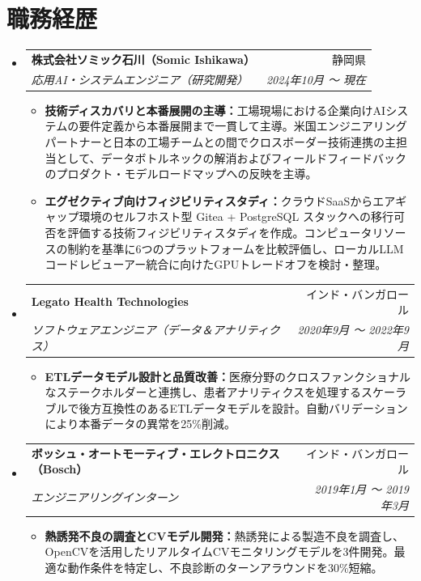 \documentclass[letterpaper,10pt]{article}
\makeatletter
\newcommand{\resumeItem}[1]{
  \item\small{
    {#1 \vspace{-1pt}}
  }
}
\newcommand{\resumeSubheading}[4]{
  \vspace{1.5pt}\item
    \begin{tabular*}{0.97\textwidth}[t]{l@{\extracolsep{\fill}}r}
      \textbf{#1} & #2 \\
      \textit{\small#3} & \textit{\small #4} \\
    \end{tabular*}\vspace{-5pt}
}
\newcommand{\resumeSubHeadingListStart}{\begin{itemize}[leftmargin=0.15in, label={}]}
\newcommand{\resumeSubHeadingListEnd}{\end{itemize}}
\newcommand{\resumeItemListStart}{\begin{itemize}}
\newcommand{\resumeItemListEnd}{\end{itemize}\vspace{-2pt}}
\makeatother
\begin{document}
\section{職務経歴}
  \resumeSubHeadingListStart

    \resumeSubheading
      {株式会社ソミック石川（Somic Ishikawa）}{静岡県}
      {応用AI・システムエンジニア（研究開発）}{2024年10月 〜 現在}
      \resumeItemListStart
        \resumeItem{\textbf{技術ディスカバリと本番展開の主導：}工場現場における企業向けAIシステムの要件定義から本番展開まで一貫して主導。米国エンジニアリングパートナーと日本の工場チームとの間でクロスボーダー技術連携の主担当として、データボトルネックの解消およびフィールドフィードバックのプロダクト・モデルロードマップへの反映を主導。}
        \resumeItem{\textbf{エグゼクティブ向けフィジビリティスタディ：}クラウドSaaSからエアギャップ環境のセルフホスト型 Gitea + PostgreSQL スタックへの移行可否を評価する技術フィジビリティスタディを作成。コンピュータリソースの制約を基準に6つのプラットフォームを比較評価し、ローカルLLMコードレビューアー統合に向けたGPUトレードオフを検討・整理。}
      \resumeItemListEnd

    \resumeSubheading
      {Legato Health Technologies}{インド・バンガロール}
      {ソフトウェアエンジニア（データ＆アナリティクス）}{2020年9月 〜 2022年9月}
      \resumeItemListStart
        \resumeItem{\textbf{ETLデータモデル設計と品質改善：}医療分野のクロスファンクショナルなステークホルダーと連携し、患者アナリティクスを処理するスケーラブルで後方互換性のあるETLデータモデルを設計。自動バリデーションにより本番データの異常を25\%削減。}
      \resumeItemListEnd

    \resumeSubheading
      {ボッシュ・オートモーティブ・エレクトロニクス（Bosch）}{インド・バンガロール}
      {エンジニアリングインターン}{2019年1月 〜 2019年3月}
      \resumeItemListStart
        \resumeItem{\textbf{熱誘発不良の調査とCVモデル開発：}熱誘発による製造不良を調査し、OpenCVを活用したリアルタイムCVモニタリングモデルを3件開発。最適な動作条件を特定し、不良診断のターンアラウンドを30\%短縮。}
      \resumeItemListEnd

  \resumeSubHeadingListEnd


\end{document}
